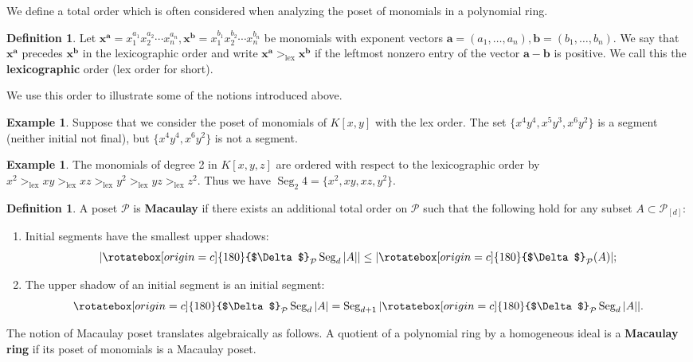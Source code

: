 \documentclass[11pt, reqno]{amsart}
\newcommand{\ba}{{\mathbf a}}
\newcommand{\bb}{{\mathbf b}}
\newcommand{\bx}{{\mathbf x}}
\renewcommand{\P}{{\mathcal P}}
\def\lex{\operatorname{lex}}
\newcommand{\uSdw}{\rotatebox[origin=c]{180}{$\Delta$}}
\def\Seg{\operatorname{Seg}}
\theoremstyle{plain} %
\theoremstyle{definition}
\newtheorem{defn}[thm]{Definition}
\newtheorem{ex}[thm]{Example}
\theoremstyle{remark}
\numberwithin{equation}{section}  %
\begin{document}
We define a total order which is often considered when analyzing the poset of monomials in a polynomial ring.
\begin{defn}\label{def: lex}
Let $\bx^\ba=x_1^{a_1}x_2^{a_2}\cdots x_n^{a_n} ,\bx^\bb=x_1^{b_1}x_2^{b_2}\cdots x_n^{b_n}$ be monomials with exponent vectors $\ba=(a_1,\ldots, a_n), \bb=(b_1,\ldots, b_n)$. We say that  $\bx^\ba$ precedes $\bx^\bb$ in the lexicographic order and write $\bx^\ba >_{\lex} \bx^\bb$ if  the leftmost nonzero entry of the vector $\ba-\bb$ is positive. We call this the \textbf{lexicographic} order (lex order for short).
\end{defn}

We use this order to illustrate some of the notions introduced above.

\begin{ex}
Suppose that we consider the poset of monomials of $K[x,y]$ with the lex order.
The set $ \{x^4y^4,x^5y^3,x^6y^2\}$ is a segment (neither initial not final), 
but $\{x^4y^4,x^6y^2\}$ is not a segment.
\end{ex}
    
\begin{ex}
The monomials of degree 2 in $K[x,y,z]$ are ordered with respect to the lexicographic order by
$x^2>_{\lex} xy>_{\lex} xz>_{\lex} y^2>_{\lex} yz>_{\lex} z^2$. Thus we have $\Seg_2 4=\{x^2, xy, xz, y^2\}$.
\end{ex}


\begin{defn}\label{def: Macaulay}
A poset $\P$ is {\bf Macaulay} if there exists an additional total order on $\P$ such that the following hold for any subset $A\subset \P_{[d]}$:
\begin{enumerate}
\item Initial segments have the smallest upper shadows: 
\[
\left | \uSdw_\P\Seg_d |A|  \right | \leq  |\uSdw_\P(A)|;
\]
\item The upper shadow of an initial segment is an initial segment:
\[
 \uSdw_\P  \Seg_d |A| =\Seg_{d+1} |\uSdw_\P\Seg_d|A||.
\]
\end{enumerate}
\end{defn}

The notion of Macaulay poset translates algebraically as follows. A quotient of a polynomial ring by a homogeneous ideal is a {\bf Macaulay ring} if its poset of monomials is a Macaulay poset.
\end{document}
